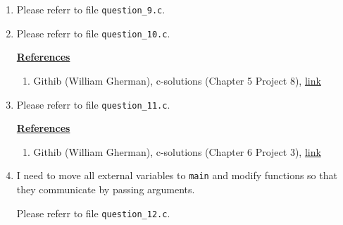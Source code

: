\documentclass[12pt]{article}
\begin{document}
\begin{enumerate}[1.]
    \item

    Please referr to file \texttt{question\_9.c}.

    \item

    Please referr to file \texttt{question\_10.c}.

    \bigskip

    \underline{\textbf{References}}

    \begin{enumerate}[1)]
        \item Githib (William Gherman), c-solutions (Chapter 5 Project 8), \href{https://github.com/williamgherman/c-solutions/blob/master/05/projects/08/8.c}{link}
    \end{enumerate}

    \item

    Please referr to file \texttt{question\_11.c}.

    \bigskip

    \underline{\textbf{References}}

    \begin{enumerate}[1)]
        \item Githib (William Gherman), c-solutions (Chapter 6 Project 3), \href{https://github.com/williamgherman/c-solutions/blob/master/06/projects/03/3.c}{link}
    \end{enumerate}

    \item

    I need to move all external variables to \texttt{main} and modify functions
    so that they communicate by passing arguments.

    \bigskip

    Please referr to file \texttt{question\_12.c}.

    \bigskip
\end{enumerate}
\end{document}
